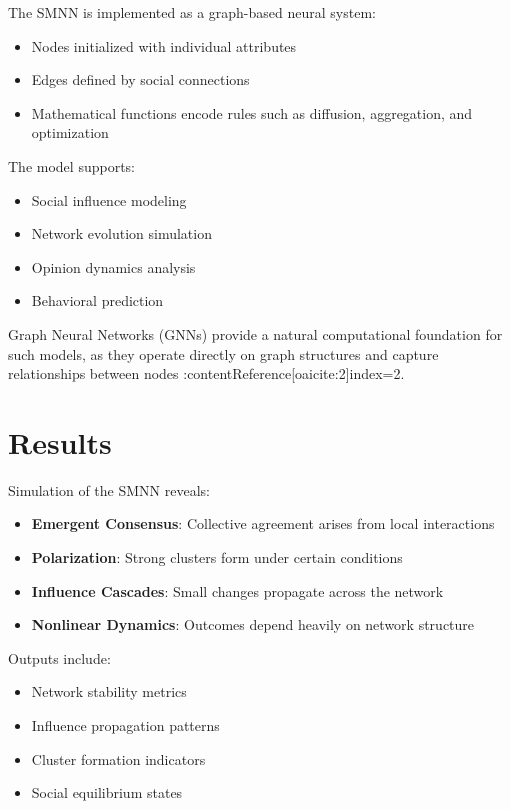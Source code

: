 \documentclass[12pt]{article}
\begin{document}
The SMNN is implemented as a graph-based neural system:

\begin{itemize}
\item Nodes initialized with individual attributes
\item Edges defined by social connections
\item Mathematical functions encode rules such as diffusion, aggregation, and optimization
\end{itemize}

The model supports:

\begin{itemize}
\item Social influence modeling
\item Network evolution simulation
\item Opinion dynamics analysis
\item Behavioral prediction
\end{itemize}

Graph Neural Networks (GNNs) provide a natural computational foundation for such models, as they operate directly on graph structures and capture relationships between nodes :contentReference[oaicite:2]{index=2}.

\section{Results}

Simulation of the SMNN reveals:

\begin{itemize}
\item \textbf{Emergent Consensus}: Collective agreement arises from local interactions
\item \textbf{Polarization}: Strong clusters form under certain conditions
\item \textbf{Influence Cascades}: Small changes propagate across the network
\item \textbf{Nonlinear Dynamics}: Outcomes depend heavily on network structure
\end{itemize}

Outputs include:

\begin{itemize}
\item Network stability metrics
\item Influence propagation patterns
\item Cluster formation indicators
\item Social equilibrium states
\end{itemize}
\end{document}
